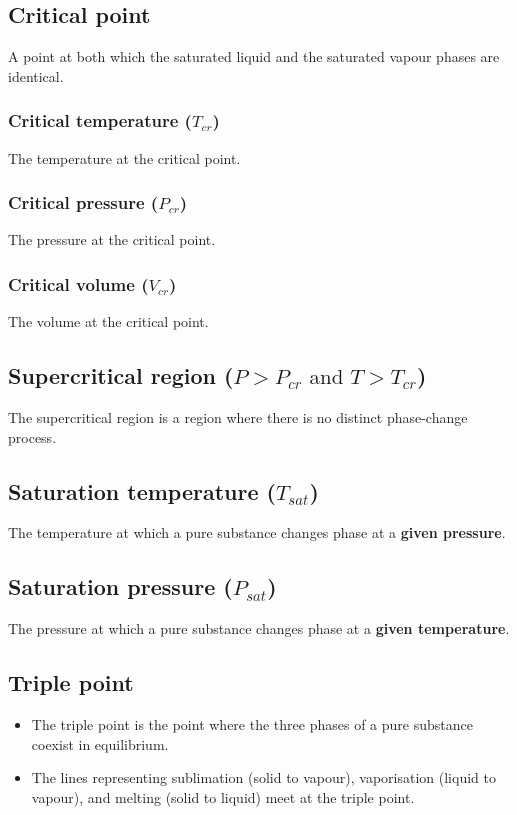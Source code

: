 \documentclass[11pt]{article}
\begin{document}
\subsection{Critical point}
\label{sec:org63c70ad}
A point at both which the saturated liquid and the saturated vapour phases are identical.

\subsubsection{Critical temperature (\(T_{cr}\))}
\label{sec:org202b72f}
The temperature at the critical point.

\subsubsection{Critical pressure (\(P_{cr}\))}
\label{sec:orge2d8427}
The pressure at the critical point.

\subsubsection{Critical volume (\(V_{cr}\))}
\label{sec:org6954e8c}
The volume at the critical point.

\subsection{Supercritical region (\(P > P_{cr} \text{ and } T > T_{cr}\))}
\label{sec:org090f97a}
The supercritical region is a region where there is no distinct phase-change process.

\subsection{Saturation temperature (\(T_{sat}\))}
\label{sec:org4af2c1d}
The temperature at which a pure substance changes phase at a \textbf{given pressure}.

\subsection{Saturation pressure (\(P_{sat}\))}
\label{sec:org32eecbb}
The pressure at which a pure substance changes phase at a \textbf{given temperature}.

\subsection{Triple point}
\label{sec:orge88accc}
\begin{itemize}
\item The triple point is the point where the three phases of a pure substance coexist in equilibrium.
\item The lines representing sublimation (solid to vapour), vaporisation (liquid to vapour), and melting (solid to liquid) meet at the triple point.
\end{itemize}
\end{document}
